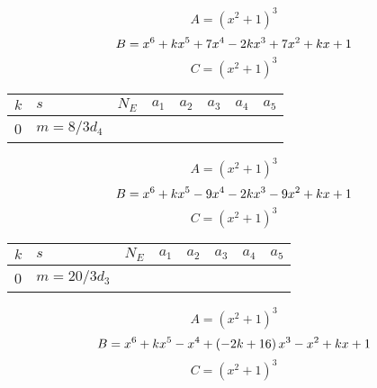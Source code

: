 \documentclass{amsart}
\begin{document}
$$A=(x^2
 + 1)^{3}$$
$$B=x^6
 + k\*x^5
 + 7\*x^4
 - 2\*k\*x^3
 + 7\*x^2
 + k\*x
 + 1$$
$$C=(x^2
 + 1)^{3}$$
\begin{longtable}{|l|l|l|lllll|}
\hline
$k$ & $s$ & $N_E$ & $a_1$ & $a_2$ & $a_3$ & $a_4$ & $a_5$\\
\hline
0&$m=8/3d_{4}$&&\multicolumn{5}{c|}{}\\
\hline
\end{longtable}
$$A=(x^2
 + 1)^{3}$$
$$B=x^6
 + k\*x^5
 - 9\*x^4
 - 2\*k\*x^3
 - 9\*x^2
 + k\*x
 + 1$$
$$C=(x^2
 + 1)^{3}$$
\begin{longtable}{|l|l|l|lllll|}
\hline
$k$ & $s$ & $N_E$ & $a_1$ & $a_2$ & $a_3$ & $a_4$ & $a_5$\\
\hline
0&$m=20/3d_{3}$&&\multicolumn{5}{c|}{}\\
\hline
\end{longtable}
$$A=(x^2
 + 1)^{3}$$
$$B=x^6
 + k\*x^5
 - x^4
 + \left(-2\*k
 + 16\right) \*x^3
 - x^2
 + k\*x
 + 1$$
$$C=(x^2
 + 1)^{3}$$
\end{document}
